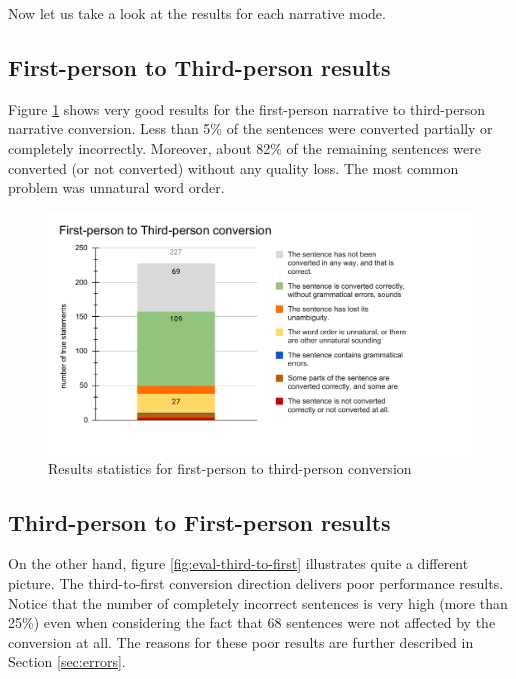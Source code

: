 Now let us take a look at the results for each narrative mode.

\subsection{First-person to Third-person results}

Figure \ref{fig:eval-first-to-third} shows very good results for the first-person narrative to third-person narrative conversion. Less than 5\% of the sentences were converted partially or completely incorrectly. Moreover, about 82\% of the remaining sentences were converted (or not converted) without any quality loss. The most common problem was unnatural word order.

\begin{figure}[!ht]
\includegraphics[width=\textwidth]{data/Eval-First-To-Third.pdf}
\caption{Results statistics for first-person to third-person conversion}
\label{fig:eval-first-to-third}
\end{figure}



\subsection{Third-person to First-person results}
On the other hand, figure \ref{fig:eval-third-to-first} illustrates quite a different picture. The third-to-first conversion direction delivers poor performance results. Notice that the number of completely incorrect sentences is very high (more than 25\%) even when considering the fact that 68 sentences were not affected by the conversion at all.
The reasons for these poor results are further described in Section \ref{sec:errors}.

